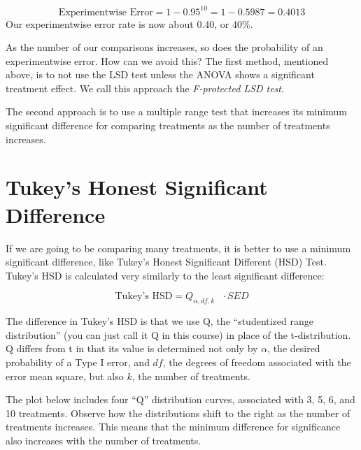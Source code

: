 \documentclass[
]{book}
\begin{document}
\[ \text{Experimentwise Error} = 1 - 0.95^{10} = 1 - 0.5987 = 0.4013\]
Our experimentwise error rate is now about 0.40, or 40\%.

As the number of our comparisons increases, so does the probability of an experimentwise error. How can we avoid this? The first method, mentioned above, is to not use the LSD test unless the ANOVA shows a significant treatment effect. We call this approach the \emph{F-protected LSD test}.

The second approach is to use a multiple range test that increases its minimum significant difference for comparing treatments as the number of treatments increases.

\hypertarget{tukeys-honest-significant-difference}{%
\section{Tukey's Honest Significant Difference}\label{tukeys-honest-significant-difference}}

If we are going to be comparing many treatments, it is better to use a minimum significant difference, like Tukey's Honest Significant Different (HSD) Test. Tukey's HSD is calculated very similarly to the least significant difference:

\[ \text{Tukey's HSD} = Q_{\alpha, df, k} \text{ } \cdot SED \]

The difference in Tukey's HSD is that we use Q, the ``studentized range distribution'' (you can just call it Q in this course) in place of the t-distribution. Q differs from t in that its value is determined not only by \(\alpha\), the desired probability of a Type I error, and \(df\), the degrees of freedom associated with the error mean square, but also \(k\), the number of treatments.

The plot below includes four ``Q'' distribution curves, associated with 3, 5, 6, and 10 treatments. Observe how the distributions shift to the right as the number of treatments increases. This means that the minimum difference for significance also increases with the number of treatments.
\end{document}
